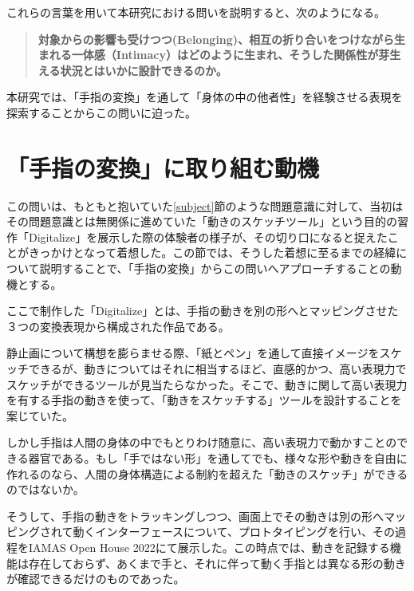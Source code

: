 これらの言葉を用いて本研究における問いを説明すると、次のようになる。

\begin{quote}
\textbf{対象からの影響も受けつつ(Belonging)、相互の折り合いをつけながら生まれる一体感（Intimacy）はどのように生まれ、そうした関係性が芽生える状況とはいかに設計できるのか。}
\end{quote}

本研究では、「手指の変換」を通して「身体の中の他者性」を経験させる表現を探索することからこの問いに迫った。


\section{「手指の変換」に取り組む動機}
\label{prototyping_concept_making}
この問いは、もともと抱いていた\ref{subject}節のような問題意識に対して、当初はその問題意識とは無関係に進めていた「動きのスケッチツール」という目的の習作「Digitalize」を展示した際の体験者の様子が、その切り口になると捉えたことがきっかけとなって着想した。この節では、そうした着想に至るまでの経緯について説明することで、「手指の変換」からこの問いへアプローチすることの動機とする。

ここで制作した「Digitalize」とは、手指の動きを別の形へとマッピングさせた３つの変換表現から構成された作品である。

静止画について構想を膨らませる際、「紙とペン」を通して直接イメージをスケッチできるが、動きについてはそれに相当するほど、直感的かつ、高い表現力でスケッチができるツールが見当たらなかった。そこで、動きに関して高い表現力を有する手指の動きを使って、「動きをスケッチする」ツールを設計することを案じていた。

しかし手指は人間の身体の中でもとりわけ随意に、高い表現力で動かすことのできる器官である。もし「手ではない形」を通してでも、様々な形や動きを自由に作れるのなら、人間の身体構造による制約を超えた「動きのスケッチ」ができるのではないか。

そうして、手指の動きをトラッキングしつつ、画面上でその動きは別の形へマッピングされて動くインターフェースについて、プロトタイピングを行い、その過程をIAMAS Open House 2022にて展示した。この時点では、動きを記録する機能は存在しておらず、あくまで手と、それに伴って動く手指とは異なる形の動きが確認できるだけのものであった。

